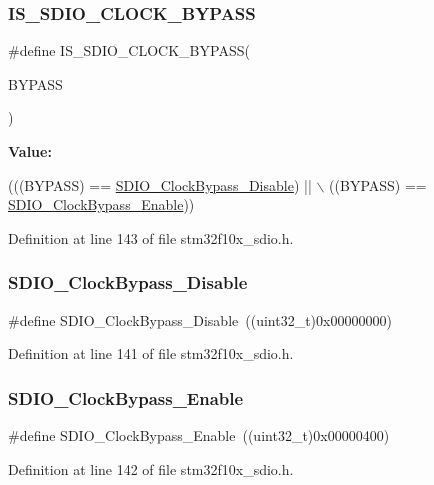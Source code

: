 \subsubsection{\texorpdfstring{I\+S\+\_\+\+S\+D\+I\+O\+\_\+\+C\+L\+O\+C\+K\+\_\+\+B\+Y\+P\+A\+SS}{IS\_SDIO\_CLOCK\_BYPASS}}
{\footnotesize\ttfamily \#define I\+S\+\_\+\+S\+D\+I\+O\+\_\+\+C\+L\+O\+C\+K\+\_\+\+B\+Y\+P\+A\+SS(\begin{DoxyParamCaption}\item[{}]{B\+Y\+P\+A\+SS }\end{DoxyParamCaption})}

{\bfseries Value\+:}
\begin{DoxyCode}
(((BYPASS) == \hyperlink{group___s_d_i_o___clock___bypass_gacc168d55136a0c6575e5afd7a6550343}{SDIO\_ClockBypass\_Disable}) || \(\backslash\)
                                     ((BYPASS) == \hyperlink{group___s_d_i_o___clock___bypass_ga5e1e9f7e05ea62dd2315eb556bc10e5c}{SDIO\_ClockBypass\_Enable}))
\end{DoxyCode}


Definition at line 143 of file stm32f10x\+\_\+sdio.\+h.

\mbox{\label{group___s_d_i_o___clock___bypass_gacc168d55136a0c6575e5afd7a6550343}} 
\subsubsection{\texorpdfstring{S\+D\+I\+O\+\_\+\+Clock\+Bypass\+\_\+\+Disable}{SDIO\_ClockBypass\_Disable}}
{\footnotesize\ttfamily \#define S\+D\+I\+O\+\_\+\+Clock\+Bypass\+\_\+\+Disable~((uint32\+\_\+t)0x00000000)}



Definition at line 141 of file stm32f10x\+\_\+sdio.\+h.

\mbox{\label{group___s_d_i_o___clock___bypass_ga5e1e9f7e05ea62dd2315eb556bc10e5c}} 
\subsubsection{\texorpdfstring{S\+D\+I\+O\+\_\+\+Clock\+Bypass\+\_\+\+Enable}{SDIO\_ClockBypass\_Enable}}
{\footnotesize\ttfamily \#define S\+D\+I\+O\+\_\+\+Clock\+Bypass\+\_\+\+Enable~((uint32\+\_\+t)0x00000400)}



Definition at line 142 of file stm32f10x\+\_\+sdio.\+h.

